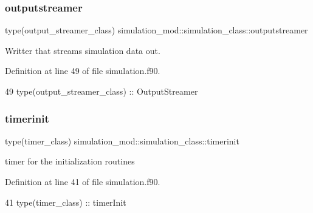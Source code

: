 \subsubsection{\texorpdfstring{outputstreamer}{outputstreamer}}
{\footnotesize\ttfamily type(output\+\_\+streamer\+\_\+class) simulation\+\_\+mod\+::simulation\+\_\+class\+::outputstreamer\hspace{0.3cm}{\ttfamily [private]}}



Writter that streams simulation data out. 



Definition at line 49 of file simulation.\+f90.


\begin{DoxyCode}
49         \textcolor{keywordtype}{type}(output\_streamer\_class) :: OutputStreamer
\end{DoxyCode}
\mbox{\label{structsimulation__mod_1_1simulation__class_ae5fe25a2db3a3e3c6896c13af90edb1c}} 
\subsubsection{\texorpdfstring{timerinit}{timerinit}}
{\footnotesize\ttfamily type(timer\+\_\+class) simulation\+\_\+mod\+::simulation\+\_\+class\+::timerinit\hspace{0.3cm}{\ttfamily [private]}}



timer for the initialization routines 



Definition at line 41 of file simulation.\+f90.


\begin{DoxyCode}
41         \textcolor{keywordtype}{type}(timer\_class) :: timerInit
\end{DoxyCode}
\mbox{\label{structsimulation__mod_1_1simulation__class_a05c525021082f10b6d452d9cf588c251}} 
